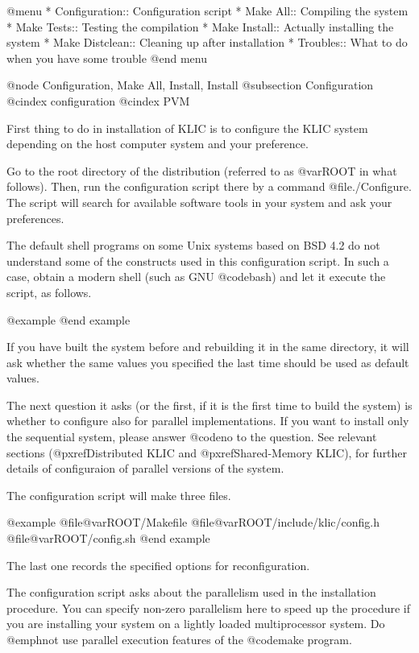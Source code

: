 {{{{@menu
* Configuration::               Configuration script
* Make All::                    Compiling the system
* Make Tests::                  Testing the compilation
* Make Install::                Actually installing the system
* Make Distclean::              Cleaning up after installation
* Troubles::                    What to do when you have some trouble
@end menu

@node Configuration, Make All, Install, Install
@subsection Configuration
@cindex configuration
@cindex PVM

First thing to do in installation of KLIC is to configure the KLIC
system depending on the host computer system and your preference.

Go to the root directory of the distribution (referred to as @var{ROOT}
in what follows).  Then, run the configuration script there by a command
@file{./Configure}.  The script will search for available software tools
in your system and ask your preferences.

The default shell programs on some Unix systems based on BSD 4.2 do not
understand some of the constructs used in this configuration script.  In
such a case, obtain a modern shell (such as GNU @code{bash}) and let it
execute the script, as follows.

@example
@end example

If you have built the system before and rebuilding it in the same
directory, it will ask whether the same values you specified the last
time should be used as default values.

The next question it asks (or the first, if it is the first time to
build the system) is whether to configure also for parallel
implementations.  If you want to install only the sequential system,
please answer @code{no} to the question.  See relevant sections
(@pxref{Distributed KLIC} and @pxref{Shared-Memory KLIC}), for further
details of configuraion of parallel versions of the system.

The configuration script will make three files.

@example
@file{@var{ROOT}/Makefile}
@file{@var{ROOT}/include/klic/config.h}
@file{@var{ROOT}/config.sh}
@end example

The last one records the specified options for reconfiguration.

The configuration script asks about the parallelism used in the
installation procedure.  You can specify non-zero parallelism here to
speed up the procedure if you are installing your system on a lightly
loaded multiprocessor system.  Do @emph{not} use parallel execution
features of the @code{make} program.

}}}}
